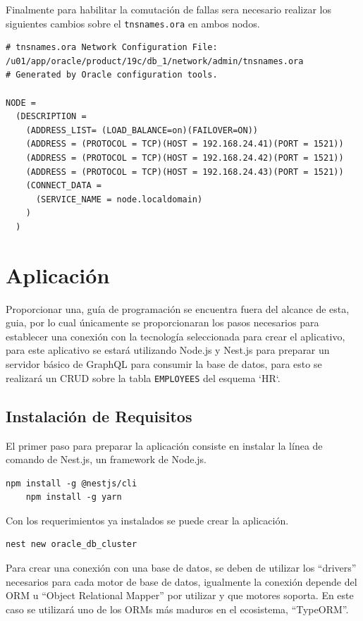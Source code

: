 \documentclass{article}
\begin{document}
Finalmente para habilitar la comutación de fallas sera necesario realizar los siguientes cambios sobre el \texttt{tnsnames.ora} en ambos nodos.


\begin{lstlisting}[style=mystyle]
# tnsnames.ora Network Configuration File: /u01/app/oracle/product/19c/db_1/network/admin/tnsnames.ora
# Generated by Oracle configuration tools.

NODE =
  (DESCRIPTION =
    (ADDRESS_LIST= (LOAD_BALANCE=on)(FAILOVER=ON))
    (ADDRESS = (PROTOCOL = TCP)(HOST = 192.168.24.41)(PORT = 1521))
    (ADDRESS = (PROTOCOL = TCP)(HOST = 192.168.24.42)(PORT = 1521))
    (ADDRESS = (PROTOCOL = TCP)(HOST = 192.168.24.43)(PORT = 1521))
    (CONNECT_DATA =
      (SERVICE_NAME = node.localdomain)
    )
  )
\end{lstlisting}

\section{Aplicación}

Proporcionar una, guía de programación se encuentra fuera del alcance de esta, guia, por lo cual únicamente se proporcionaran los pasos necesarios para establecer una conexión con la tecnología seleccionada para crear el aplicativo, para este aplicativo se estará utilizando Node.js y Nest.js para preparar un servidor básico de GraphQL para consumir la base de datos, para esto se realizará un CRUD sobre la tabla \texttt{EMPLOYEES} del esquema `HR`. 

\subsection{Instalación de Requisitos}

El primer paso para preparar la aplicación consiste en instalar la línea de comando de Nest.js, un framework de Node.js.

\begin{lstlisting}[style=mystyle]
	npm install -g @nestjs/cli
	npm install -g yarn
\end{lstlisting}

Con los requerimientos ya instalados se puede crear la aplicación.

\begin{lstlisting}[style=mystyle]
	nest new oracle_db_cluster
\end{lstlisting}

Para crear una conexión con una base de datos, se deben de utilizar los ``drivers'' necesarios para cada motor de base de datos, igualmente la conexión depende del ORM u ``Object Relational Mapper'' por utilizar y que motores soporta. En este caso se utilizará uno de los ORMs más maduros en el ecosistema, ``TypeORM''. 
\end{document}
